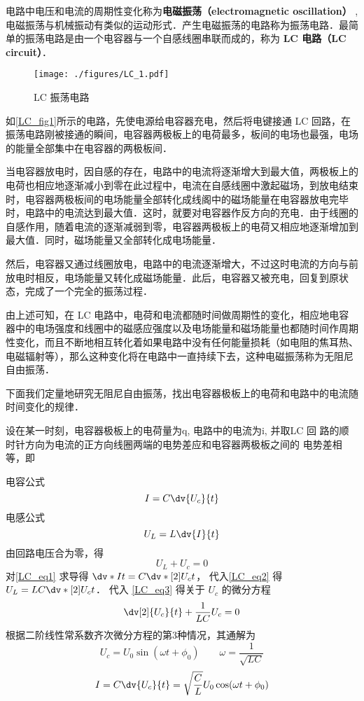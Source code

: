 
电路中电压和电流的周期性变化称为\textbf{电磁振荡（electromagnetic oscillation）} , 电磁振荡与机械振动有类似的运动形式．产生电磁振荡的电路称为振荡电路．最简单的振荡电路是由一个电容器与一个自感线圈串联而成的，称为\textbf{ LC 电路（LC circuit）}．
\begin{figure}[ht]
\centering
\texttt{[image: ./figures/LC\_1.pdf]}
\caption{LC 振荡电路} \label{LC_fig1}
\end{figure}

如\autoref{LC_fig1}所示的电路，先使电源给电容器充电，然后将电键接通 LC 回路，在振荡电路刚被接通的瞬间，电容器两极板上的电荷最多，板间的电场也最强，电场的能量全部集中在电容器的两极板间．

当电容器放电时，因自感的存在，电路中的电流将逐渐增大到最大值，两极板上的电荷也相应地逐渐减小到零在此过程中，电流在自感线圈中激起磁场，到放电结束时，电容器两极板间的电场能量全部转化成线阁中的磁场能量在电容器放电完毕时，电路中的电流达到最大值．这时，就要对电容器作反方向的充电．由于线圈的自感作用，随着电流的逐渐减弱到零，电容器两极板上的电荷又相应地逐渐增加到最大值．同时，磁场能量又全部转化成电场能量．

然后，电容器又通过线圈放电，电路中的电流逐渐增大，不过这时电流的方向与前放电时相反，电场能量又转化成磁场能量．此后，电容器又被充电，回复到原状态，完成了一个完全的振荡过程．

由上述可知，在 LC 电路中，电荷和电流都随时间做周期性的变化，相应地电容器中的电场强度和线圈中的磁感应强度以及电场能量和磁场能量也都随时间作周期性变化，而且不断地相互转化着如果电路中没有任何能量损耗（如电阻的焦耳热、电磁辐射等），那么这种变化将在电路中一直持续下去，这种电磁振荡称为无阻尼自由振荡．

下面我们定量地研究无阻尼自由振荡，找出电容器极板上的电荷和电路中的电流随时间变化的规律．

设在某一时刻，电容器极板上的电荷量为q, 电路中的电流为i, 并取LC 回
路的顺时针方向为电流的正方向线圈两端的电势差应和电容器两极板之间的
电势差相等，即

电容公式
\begin{equation}\label{LC_eq1}
I = C \dv{U_c}{t}
\end{equation}
电感公式
\begin{equation}\label{LC_eq2}
U_L = L \dv{I}{t}
\end{equation}
由回路电压合为零，得
\begin{equation}\label{LC_eq3}
U_L + U_c = 0
\end{equation}
对\autoref{LC_eq1} 求导得 $\dv*{I}{t} = C \dv*[2]{U_c}{t}$， 代入\autoref{LC_eq2} 得 $U_L = LC \dv*[2]{U_c}{t}$． 代入  \autoref{LC_eq3}  得关于 $U_c$ 的微分方程
\begin{equation}
\dv[2]{U_c}{t} + \frac{1}{LC} U_c = 0
\end{equation}
根据二阶线性常系数齐次微分方程的第3种情况，其通解为
\begin{equation}
U_c = U_0 \sin(\omega t + \phi_0) \qquad
\omega  = \frac{1}{\sqrt {LC}}
\end{equation}
\begin{equation}
I = C \dv{U_c}{t} = \sqrt{\frac{C}{L}} U_0 \cos(\omega t + \phi_0)
\end{equation}
 

